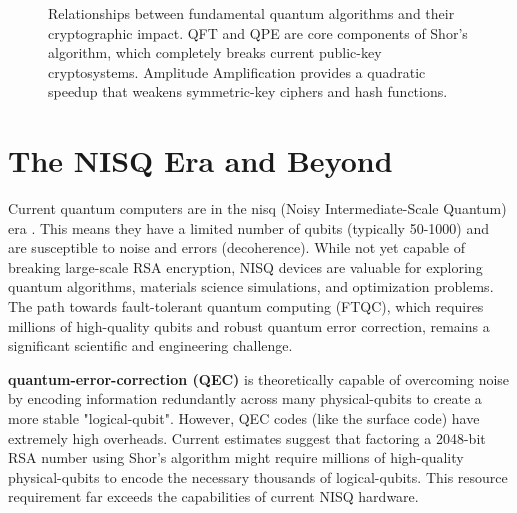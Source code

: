 \begin{figure}[h]
    \caption{Relationships between fundamental quantum algorithms and their cryptographic impact. QFT and QPE are core components of Shor's algorithm, which completely breaks current public-key cryptosystems. Amplitude Amplification provides a quadratic speedup that weakens symmetric-key ciphers and hash functions.}
    \label{fig:algo_relationships}
\end{figure}
\newpage

\section{The NISQ Era and Beyond}\label{sec:nisq_era}
Current quantum computers are in the \Gls{nisq} (Noisy Intermediate-Scale Quantum) era \parencite{Ali2022QuantumC}. This means they have a limited number of qubits (typically 50-1000) and are susceptible to noise and errors (decoherence). While not yet capable of breaking large-scale RSA encryption, NISQ devices are valuable for exploring quantum algorithms, materials science simulations, and optimization problems. The path towards fault-tolerant quantum computing (FTQC), which requires millions of high-quality qubits and robust quantum error correction, remains a significant scientific and engineering challenge.

\textbf{\Gls{quantum-error-correction} (QEC)} is theoretically capable of overcoming noise by encoding information redundantly across many \glspl{physical-qubit} to create a more stable "\gls{logical-qubit}". However, QEC codes (like the surface code) have extremely high overheads. Current estimates suggest that factoring a 2048-bit RSA number using Shor's algorithm might require millions of high-quality \glspl{physical-qubit} to encode the necessary thousands of \glspl{logical-qubit}. This resource requirement far exceeds the capabilities of current NISQ hardware.

